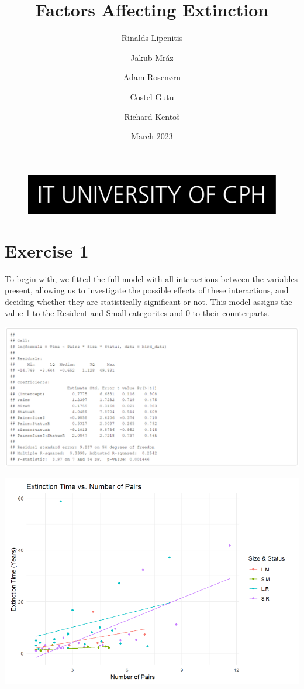 \documentclass{article}
\begin{document}
\title{Factors Affecting Extinction}

\begin{figure}
    \includegraphics[width=\linewidth]{ITU.jpg}
\end{figure}
\maketitle
\author{Rinalds Lipenitis \and Jakub Mráz \and
Adam Rosenørn \and Costel Gutu \and Richard Kentoš}
\begin{center}
\date{March 2023}
\end{center}

\newpage

\section{Exercise 1}
To begin with, we fitted the full model with all interactions between the variables present, allowing us to investigate the possible effects of these interactions,
and deciding whether they are statistically significant or not. This model assigns the value 1 to the Resident and Small categorites and 0 to their counterparts.

\includegraphics[scale=0.5]{tables/all-multiplied.png}


\begin{center}
\includegraphics[scale=0.5]{graphs/graph1.png}
\end{center}
\end{document}
